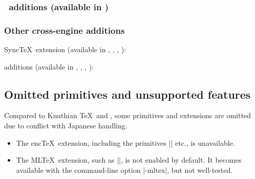 \documentclass[a4paper,11pt,dvipdfmx]{article}
\begin{document}
\subsubsection{\eupTeX\ additions (available in \eupTeX)}
\begin{simplelist}
\end{simplelist}

\subsubsection{Other cross-engine additions}
Sync\TeX\ extension (available in \pTeX, \upTeX, \epTeX, \eupTeX):
\begin{simplelist}
 \csitem[\.{synctex}]
\end{simplelist}

\noindent
\TL additions (available in \pTeX, \upTeX, \epTeX, \eupTeX):
\begin{simplelist}
\end{simplelist}


\subsection{Omitted primitives and unsupported features}

Compared to Knuthian \TeX\ and \eTeX, some primitives and extensions are
omitted due to conflict with Japanese handling.
\begin{itemize}
 \item The enc\TeX\ extension, including the primitives |\mubyte| etc.,
  is unavailable.
 \item The ML\TeX\ extension, such as |\charsubdef|, is not enabled
  by default. It becomes available with the command-line option |-mltex|,
  but not well-tested.
\end{itemize}

\end{document}
